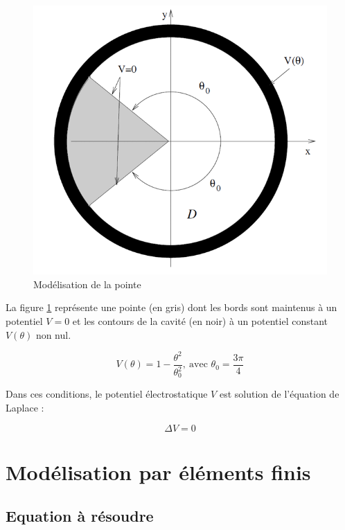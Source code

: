 \documentclass{article}
\begin{document}
\begin{figure}[!h]
    \centering
    \includegraphics[scale=0.7]{img/schema.png}
    \caption{Modélisation de la pointe}
    \label{fig:pointe}
\end{figure}

\hspace{0.5cm}
La figure \ref{fig:pointe} représente une pointe (en gris) dont les bords sont
maintenus à un potentiel $V=0$ et les contours de la cavité (en noir) à
un potentiel constant $V(\theta)$ non nul.

\begin{equation}
    V(\theta) = 1 - \frac{\theta^2}{\theta_0^2},
    \ \text{avec } \theta_0=\frac{3\pi}{4}
\end{equation}

Dans ces conditions, le potentiel électrostatique $V$ est solution de l'équation
de Laplace :

\begin{equation}
    \Delta V = 0
\end{equation}

\newpage

\section{Modélisation par éléments finis}

\subsection{Equation à résoudre}
\end{document}
